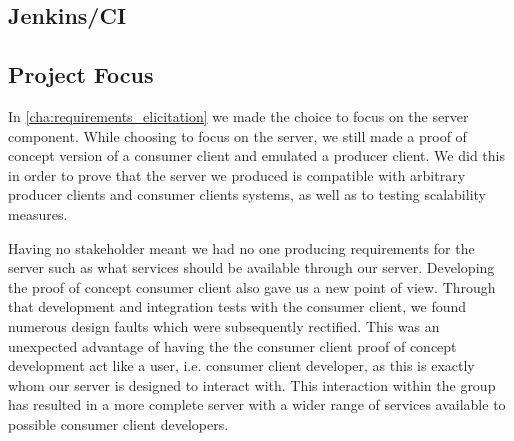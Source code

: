
\subsection{Jenkins/CI}
\subsection{Project Focus}
In \cref{cha:requirements_elicitation} we made the choice to focus on the server component.
While choosing to focus on the server, we still made a proof of concept version of a consumer client and emulated a producer client.
We did this in order to prove that the server we produced is compatible with arbitrary producer clients and consumer clients systems, as well as to testing scalability measures.

Having no stakeholder meant we had no one producing requirements for the server such as what services should be available through our server.
Developing the proof of concept consumer client also gave us a new point of view.
Through that development and integration tests with the consumer client, we found numerous design faults which were subsequently rectified.
This was an unexpected advantage of having the the consumer client proof of concept development act like a user, i.e. consumer client developer, as this is exactly whom our server is designed to interact with.
This interaction within the group has resulted in a more complete server with a wider range of services available to possible consumer client developers.

